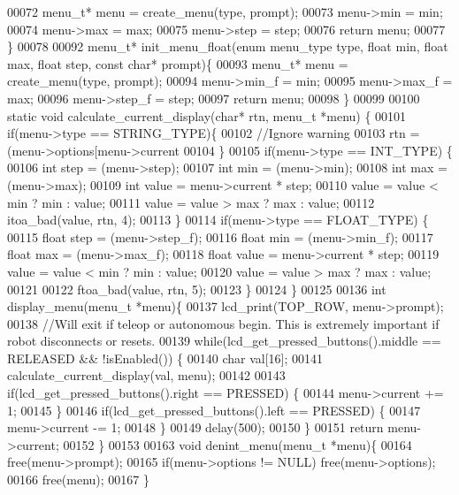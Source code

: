 \begin{DoxyCode}
00072   menu_t* menu = create_menu(type, prompt);
00073   menu->min = min;
00074   menu->max = max;
00075   menu->step = step;
00076   \textcolor{keywordflow}{return} menu;
00077 \}
00078 
00092 menu_t* init_menu_float(\textcolor{keyword}{enum} menu_type type, \textcolor{keywordtype}{float} min, \textcolor{keywordtype}{float} max, \textcolor{keywordtype}{float} step, \textcolor{keyword}{const} \textcolor{keywordtype}{char}* prompt)\{
00093   menu_t* menu = create_menu(type, prompt);
00094   menu->min_f = min;
00095   menu->max_f = max;
00096   menu->step_f = step;
00097   \textcolor{keywordflow}{return} menu;
00098 \}
00099 
00100 \textcolor{keyword}{static} \textcolor{keywordtype}{void} calculate_current_display(\textcolor{keywordtype}{char}* rtn, menu_t *menu) \{
00101   \textcolor{keywordflow}{if}(menu->type == STRING_TYPE)\{
00102     \textcolor{comment}{//Ignore warning}
00103     rtn = (menu->options[menu->current %
00104   \}
00105   \textcolor{keywordflow}{if}(menu->type == INT_TYPE) \{
00106     \textcolor{keywordtype}{int} step = (menu->step);
00107     \textcolor{keywordtype}{int} min = (menu->min);
00108     \textcolor{keywordtype}{int} max = (menu->max);
00109     \textcolor{keywordtype}{int} value = menu->current * step;
00110     value = value < min ? min : value;
00111     value = value > max ? max : value;
00112     itoa_bad(value, rtn, 4);
00113   \}
00114   \textcolor{keywordflow}{if}(menu->type == FLOAT_TYPE) \{
00115     \textcolor{keywordtype}{float} step = (menu->step_f);
00116     \textcolor{keywordtype}{float} min = (menu->min_f);
00117     \textcolor{keywordtype}{float} max = (menu->max_f);
00118     \textcolor{keywordtype}{float} value = menu->current * step;
00119     value = value < min ? min : value;
00120     value = value > max ? max : value;
00121 
00122     ftoa_bad(value, rtn, 5);
00123   \}
00124 \}
00125 
00136 \textcolor{keywordtype}{int} display_menu(menu_t *menu)\{
00137   lcd_print(TOP_ROW, menu->prompt);
00138   \textcolor{comment}{//Will exit if teleop or autonomous begin. This is extremely important if robot disconnects or resets.}
00139   \textcolor{keywordflow}{while}(lcd_get_pressed_buttons().middle == RELEASED && !isEnabled()) \{
00140     \textcolor{keywordtype}{char} val[16];
00141     calculate_current_display(val, menu);
00142 
00143     \textcolor{keywordflow}{if}(lcd_get_pressed_buttons().right == PRESSED) \{
00144       menu->current += 1;
00145     \}
00146     \textcolor{keywordflow}{if}(lcd_get_pressed_buttons().left == PRESSED) \{
00147       menu->current -= 1;
00148     \}
00149     delay(500);
00150   \}
00151   \textcolor{keywordflow}{return} menu->current;
00152 \}
00153 
00163 \textcolor{keywordtype}{void} denint_menu(menu_t *menu)\{
00164   free(menu->prompt);
00165   \textcolor{keywordflow}{if}(menu->options != NULL) free(menu->options);
00166   free(menu);
00167 \}
\end{DoxyCode}
